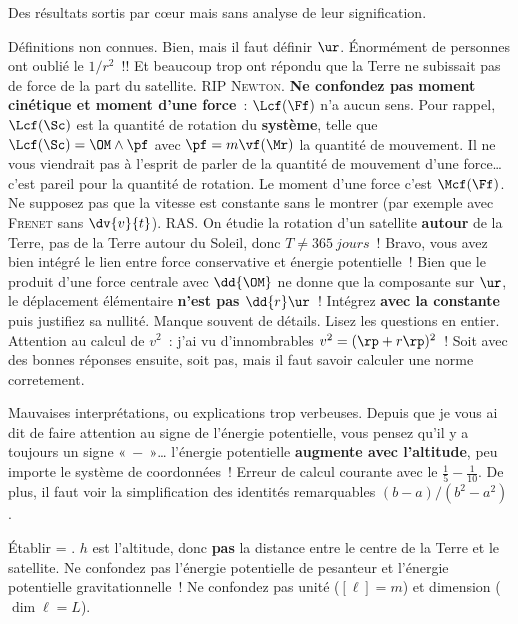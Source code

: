 \documentclass[a4paper, 10pt, final, garamond]{book}
\begin{document}
Des résultats sortis par cœur mais sans analyse de leur signification.
\begin{enumerate}
	Définitions non connues.
	Bien, mais il faut définir $\ur$. Énormément de personnes ont oublié le
	$1/r^{\boxed{2}}$~!! Et beaucoup trop ont répondu que la Terre ne subissait
	pas de force de la part du satellite. RIP \textsc{Newton}.
	\textbf{Ne confondez pas moment cinétique et moment d'une force}~: $\Lcf(\Ff)$
	n'a aucun sens. Pour rappel, $\Lcf(\Sc)$ est la quantité de rotation du
	\textbf{système}, telle que $\Lcf(\Sc) = \OM \wedge \pf$ avec $\pf =
		m\vf(\Mr)$ la quantité de mouvement. Il ne vous viendrait pas à l'esprit de
	parler de la quantité de mouvement d'une force… c'est pareil pour la quantité
	de rotation. Le moment d'une force c'est $\Mcf(\Ff)$.
	Ne supposez pas que la vitesse est constante sans le montrer (par exemple avec
	\textsc{Frenet} sans $\dv{v}{t}$).
	RAS.
	On étudie la rotation d'un satellite \textbf{autour} de la Terre, pas de la
	Terre autour du Soleil, donc $T \neq \SI{365}{jours}$~!
	Bravo, vous avez bien intégré le lien entre force conservative et énergie
	potentielle~!
	\smallbreak
	Bien que le produit d'une force centrale avec $\dd{\OM}$ ne donne que la
	composante sur $\ur$, le déplacement élémentaire \textbf{n'est pas
		$\dd{r}\ur$}~!
	\smallbreak
	Intégrez \textbf{avec la constante} puis justifiez sa nullité.
	Manque souvent de détails. Lisez les questions en entier. Attention au calcul
	de $v^2$~: j'ai vu d'innombrables $v^2 = (\rp + r\rp)^2$~! Soit avec des
	bonnes réponses ensuite, soit pas, mais il faut savoir calculer une norme
	corretement.
\end{enumerate}

\setcounter{section}{0}
\begin{enumerate}
	Mauvaises interprétations, ou explications trop verbeuses.
	Depuis que je vous ai dit de faire attention au signe de l'énergie
	potentielle, vous pensez qu'il y a toujours un signe $«~-~»$… l'énergie
	potentielle \textbf{augmente avec l'altitude}, peu importe le système de
	coordonnées~!
	Erreur de calcul courante avec le $\frac{1}{5} - \frac{1}{10}$. De plus, il
	faut voir la simplification des identités remarquables $(b-a)/(b^2-a^2)$.
\end{enumerate}

\begin{enumerate}
	Établir = . $h$ est l'altitude, donc \textbf{pas} la distance
	entre le centre de la Terre et le satellite.
	Ne confondez pas l'énergie potentielle de pesanteur et l'énergie potentielle
	gravitationnelle~!
	Ne confondez pas unité ($[\ell] = \si{m}$) et dimension ($\dim{\ell} = L$).
\end{enumerate}
\end{document}
